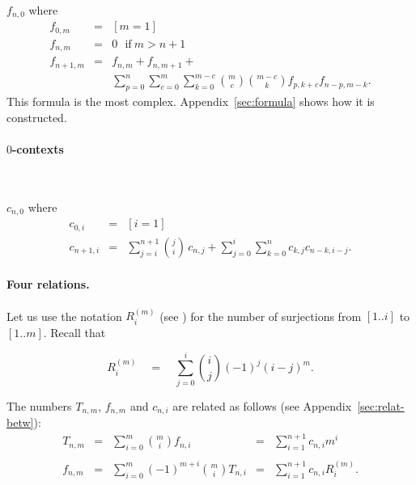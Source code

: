 \documentclass{jfp1}
\begin{document}
$f_{n,0}$ where
\begin{eqnarray*}
f_{0,m} & =& [m = 1] \\
f_{n,m} &=& 0 \textrm{~ if}~ m>n+1\\
f_{n+1,m} &= &f_{n,m} + f_{n,m+1} + \\
&& \sum_{p=0}^{n} \sum_{c=0}^{m} \sum_{k=0}^{m - c} {m \choose c} {m - c\choose k} f_{p,k+c} f_{n-p,m-k}.
\end{eqnarray*}
This formula is the most complex.  
Appendix~\ref{sec:formula} shows how it is constructed.





\paragraph{$0$-contexts}~
\label{sec:0-contexts}

$c_{n,0}$ where
  \begin{eqnarray*}
    c_{0,i} &=& [i = 1]\\
    c_{n+1,i} & = & \sum_{j=i}^{n+1} {j \choose i}\,c_{n,j} + \sum_{j=0}^i\sum_{k=0}^nc_{k,j} c_{n-k,i-j}.
  \end{eqnarray*}

\paragraph{Four relations.}
\label{sec:four-relations}

\begin{sloppypar}
  Let us use the notation $R^{(m)}_i$ (see \ifJFP \cite{flajolet08:_analy_combin}\fi) for the
  number of surjections from $[1..i]$ to $[1..m]$.  Recall that
\end{sloppypar}
\[R^{(m)}_i \quad = \quad \sum_{j=0}^i {i \choose j} (-1)^j (i-j)^m.\]

The numbers $T_{n,m}$, $f_{n,m}$ and $c_{n,i}$ are related as follows (see
Appendix~\ref{sec:relat-betw}):
\begin{displaymath}
  \begin{array}{lclcl}
    T_{n,m} &=& \displaystyle \sum_{i=0}^{m} {m \choose i} f_{n,i} & = &
    \displaystyle \sum_{i=1}^{n+1} c_{n,i}    m^i\\\\
    f_{n,m} &=& \displaystyle \sum_{i=0}^m (-1)^{m+i} {m \choose i} T_{n,i} & = &
    \displaystyle \sum_{i=1}^{n+1}     c_{n,i} R^{(m)}_i.
  \end{array}
\end{displaymath}
\end{document}
